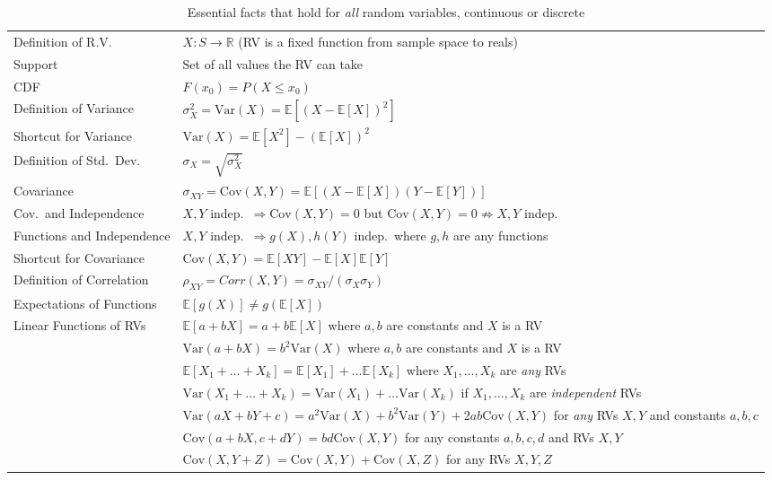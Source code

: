 \documentclass[12pt]{article}
\begin{document}
\begin{sidewaystable}
\centering
\begin{tabular}{l|l}
\hline
Definition of R.V.\ & $X\colon S \rightarrow \mathbb{R}$ (RV is a fixed function from sample space to reals) \\
Support& Set of all values the RV can take\\
CDF & $F(x_0) = P(X\leq x_0)$\\
Definition of Variance&$\sigma_X^2 = \text{Var}(X) = \mathbb{E}\left[\left(X - \mathbb{E}[X]\right)^2 \right]$\\
Shortcut for Variance&$\text{Var}(X) = \mathbb{E}[X^2] - \left(\mathbb{E}[X]\right)^2$\\
Definition of Std.\ Dev.\ &$\sigma_X = \sqrt{\sigma_X^2}$\\
Covariance&$\sigma_{XY} = \text{Cov}(X,Y) = \mathbb{E}\left[\left(X - \mathbb{E}[X]\right)\left(Y - \mathbb{E}[Y]\right)\right]$\\
Cov.\ and Independence&$X,Y$ indep.\ $\Rightarrow \text{Cov}(X,Y) = 0$ but $\text{Cov}(X,Y)=0 \nRightarrow X,Y$ indep.\\
	Functions and Independence& $X,Y$ indep.\ $\Rightarrow g(X), h(Y)$ indep.\ where $g,h$ are any functions\\
  Shortcut for Covariance&$\text{Cov}(X,Y) = \mathbb{E}[XY] - \mathbb{E}[X]\mathbb{E}[Y]$\\
Definition of Correlation & $\rho_{XY} = Corr(X,Y) = \sigma_{XY}/(\sigma_X \sigma_Y)$ \\
Expectations of Functions& $\mathbb{E}[g(X)] \neq g\left( \mathbb{E}[X]\right)$\\
Linear Functions of RVs & $\mathbb{E}[a + bX] = a + b \mathbb{E}[X]$ where $a,b$ are constants and $X$ is a RV\\
&  $\text{Var}(a+bX) = b^2 \text{Var}(X)$  where $a,b$ are constants and $X$ is a RV \\
& $\mathbb{E}[X_1 + \hdots + X_k] = \mathbb{E}[X_1] + \hdots \mathbb{E}[X_k]$ where $X_1, \hdots, X_k$ are \emph{any} RVs\\
& $\text{Var}(X_1 + \hdots + X_k) = \text{Var}(X_1) + \hdots \text{Var}(X_k)$ if $X_1, \hdots, X_k$ are \emph{independent} RVs\\
&$\text{Var}(aX + bY + c) = a^2 \text{Var}(X) + b^2 \text{Var}(Y) + 2ab \text{Cov}(X,Y)$ for \emph{any} RVs $X,Y$ and constants $a,b,c$\\
& $\text{Cov}(a + bX, c + dY) = bd \text{Cov}(X,Y)$ for any constants $a,b,c,d$ and RVs $X,Y$ \\
& $\text{Cov}(X, Y + Z) = \text{Cov}(X,Y) + \text{Cov}(X, Z)$ for any RVs $X,Y,Z$\\
\hline
\end{tabular}
\caption{Essential facts that hold for \emph{all} random variables, continuous or discrete}
\end{sidewaystable}
\end{document}
